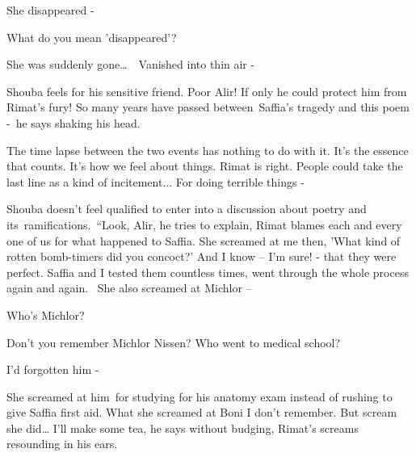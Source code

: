 \documentclass[letterpaper]{article}
\begin{document}
{\textquotedbl}She disappeared -{\textquotedbl} 

{\textquotedbl}What do you mean 'disappeared'?{\textquotedbl} 

{\textquotedbl}She was suddenly gone{\dots}\ \ Vanished into thin air -{\textquotedbl}

Shouba feels for his sensitive friend. Poor Alir! If only he could protect him from Rimat's fury! {\textquotedbl}So many
years have passed between~Saffia's tragedy and this poem -{\textquotedbl}\ he says shaking his head. 

{\textquotedbl}The time lapse between the two events has nothing to do with it. It's the essence that counts. It's how
we feel about things. Rimat is right. People could take the last line as a kind of incitement... For doing terrible
things -{\textquotedbl} 

Shouba doesn't feel qualified to enter into a discussion about poetry and its\textcolor{red}{\ }ramifications.\  ``Look,
Alir,{\textquotedbl} he tries to explain, {\textquotedbl}Rimat blames each and every one of us for what happened to
Saffia. She screamed at me then, 'What kind of rotten bomb-timers did you concoct?' And I know -- I'm sure! - that they
were perfect. Saffia and I tested them countless times, went through the whole process again and again. ~She also
screamed at Michlor --{\textquotedbl} 

{\textquotedbl}Who's Michlor?{\textquotedbl} 

{\textquotedbl}Don't you remember Michlor Nissen? Who went to medical school?{\textquotedbl} 

{\textquotedbl}I'd forgotten him -{\textquotedbl} 

{\textquotedbl}She screamed at him~for studying for his anatomy exam instead of rushing to give Saffia first aid. What
she screamed at Boni I don't remember. But scream she did{\dots} I'll make some tea,{\textquotedbl} he says without
budging, Rimat's screams resounding in his ears. 
\end{document}
